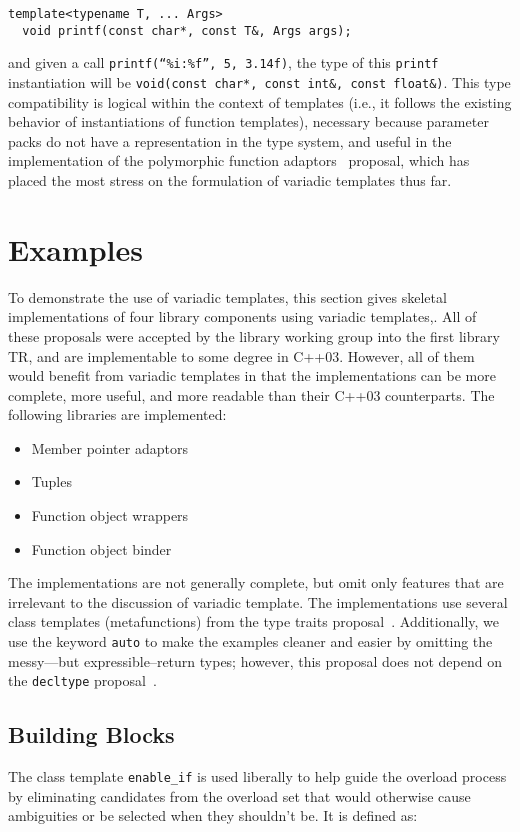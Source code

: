 \documentclass{article}
\begin{document}
\begin{verbatim}
template<typename T, ... Args>
  void printf(const char*, const T&, Args args);
\end{verbatim}

and given a call {\tt printf(``\%i:\%f'', 5, 3.14f)}, the type of this
{\tt printf} instantiation will be {\tt void(const char*, const int\&,
  const float\&)}. This type compatibility is logical within the
context of templates (i.e., it follows the existing behavior of
instantiations of function templates), necessary because parameter
packs do not have a representation in the type system, and useful in the
implementation of the polymorphic function adaptors~\cite{Gregor02}
proposal, which has placed the most stress on the formulation of
variadic templates thus far.

\section{Examples}
To demonstrate the use of variadic templates, this section gives
skeletal implementations of four library components using variadic
templates,. All of these proposals were accepted by the library
working group into the first library TR, and are implementable to some
degree in C++03. However, all of them would benefit from variadic
templates in that the implementations can be more complete, more
useful, and more readable than their C++03 counterparts. The following
libraries are implemented:

\begin{itemize}
\item Member pointer adaptors~\cite{Dimov03a}
\item Tuples~\cite{Jarvi02}
\item Function object wrappers~\cite{Gregor02}
\item Function object binder~\cite{Dimov03b}
\end{itemize}

The implementations are not generally complete, but omit only features
that are irrelevant to the discussion of variadic template. The
implementations use several class templates (metafunctions) from the
type traits proposal~\cite{Maddock03}. Additionally, we use the
keyword {\tt auto} to make the examples cleaner and easier by omitting
the messy---but expressible--return types; however, this proposal does
not depend on the {\tt decltype} proposal~\cite{Jarvi03}.

\subsection{Building Blocks}
\label{building_blocks}
The class template {\tt enable\_if} is used liberally to help guide
the overload process by eliminating candidates from the overload set
that would otherwise cause ambiguities or be selected when they
shouldn't be. It is defined as:
\end{document}
